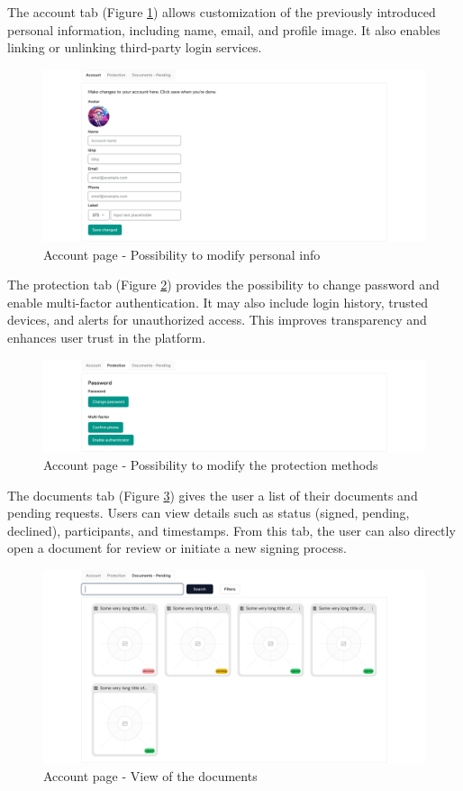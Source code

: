 The account tab (Figure \ref{accountspage-account}) allows customization of the previously introduced personal information, including name, email, and profile image. 
It also enables linking or unlinking third-party login services. 

\begin{figure}[H]
    \centering
    \includegraphics[width=18cm]{"images/figmaUI/accountspage-account-crop.png"}
    \caption{Account page - Possibility to modify personal info}
    \label{accountspage-account}
\end{figure}

The protection tab (Figure \ref{accountspage-protection}) provides the possibility to change password and enable multi-factor authentication. 
It may also include login history, trusted devices, and alerts for unauthorized access. 
This improves transparency and enhances user trust in the platform.

\begin{figure}[H]
    \centering
    \includegraphics[width=18cm]{"images/figmaUI/accountspage-protection-crop.png"}
    \caption{Account page - Possibility to modify the protection methods}
    \label{accountspage-protection}
\end{figure}

\newpage
The documents tab (Figure \ref{accountspage-documents}) gives the user a list of their documents and pending requests. 
Users can view details such as status (signed, pending, declined), participants, and timestamps. 
From this tab, the user can also directly open a document for review or initiate a new signing process. 

\begin{figure}[H]
    \centering
    \includegraphics[width=18cm]{"images/figmaUI/accountspage-documents-crop.png"}
    \caption{Account page - View of the documents}
    \label{accountspage-documents}
\end{figure}
